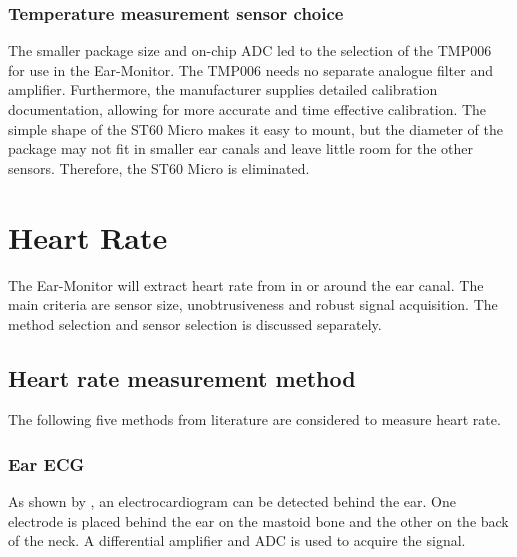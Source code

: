 \subsubsection{Temperature measurement sensor choice}
The smaller package size and on-chip ADC led to the selection of the TMP006 for use in the Ear-Monitor. The TMP006 needs no separate analogue filter and amplifier. Furthermore, the manufacturer supplies detailed calibration documentation, allowing for more accurate and time effective calibration. The simple shape of the ST60 Micro makes it easy to mount, but the diameter of the package may not fit in smaller ear canals and leave little room for the other sensors. Therefore, the ST60 Micro is eliminated.

\section{Heart Rate}
The Ear-Monitor will extract heart rate from in or around the ear canal. The main criteria are sensor size, unobtrusiveness and robust signal acquisition. The method selection and sensor selection is discussed separately. 

\subsection{Heart rate measurement method}

The following five methods from literature are considered to measure heart rate.

\subsubsection{Ear ECG}

As shown by \cite{winokur2012wearable}, an electrocardiogram can be detected behind the ear. One electrode is placed behind the ear on the mastoid bone and the other on the back of the neck. A differential amplifier and ADC is used to acquire the signal.

